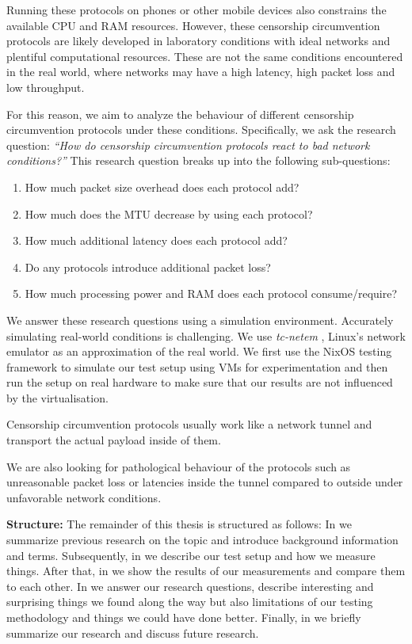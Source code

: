 Running these protocols on phones or other mobile devices also constrains the available CPU and RAM resources.
However, these censorship circumvention protocols are likely developed in laboratory conditions with ideal networks and plentiful computational resources.
These are not the same conditions encountered in the real world, where networks may have a high latency, high packet loss and low throughput.

For this reason, we aim to analyze the behaviour of different censorship circumvention protocols under these conditions.
Specifically, we ask the research question:
\emph{``How do censorship circumvention protocols react to bad network conditions?''}
This research question breaks up into the following sub-questions:
\begin{enumerate}
  \item How much packet size overhead does each protocol add?
  \item How much does the MTU decrease by using each protocol?
  \item How much additional latency does each protocol add?
  \item Do any protocols introduce additional packet loss?
  \item How much processing power and RAM does each protocol consume/require?
\end{enumerate}

We answer these research questions using a simulation environment.
Accurately simulating real-world conditions is challenging.
We use \textit{tc-netem} \cite{man8:tc-netem}, Linux's network emulator as an approximation of the real world.
We first use the NixOS testing framework to simulate our test setup using VMs for experimentation and then run the setup on real hardware to make sure that our results are not influenced by the virtualisation.

Censorship circumvention protocols usually work like a network tunnel and transport the actual payload inside of them.

We are also looking for pathological behaviour of the protocols such as unreasonable packet loss or latencies inside the tunnel compared to outside under unfavorable network conditions.

\noindent\textbf{Structure:}
The remainder of this thesis is structured as follows:
In  we summarize previous research on the topic and introduce background information and terms.
Subsequently, in  we describe our test setup and how we measure things.
After that, in  we show the results of our measurements and compare them to each other.
In  we answer our research questions, describe interesting and surprising things we found along the way but also limitations of our testing methodology and things we could have done better.
Finally, in  we briefly summarize our research and discuss future research.
